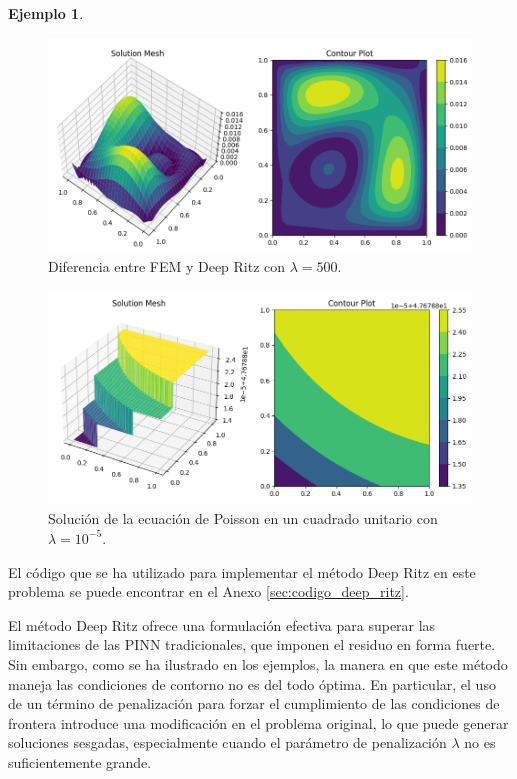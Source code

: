 \documentclass[a4paper,11pt,spanish, twoside, leqno]{tfg-uam}
\theoremstyle{definition}
\newtheorem{exmp}[teor]{Ejemplo}
\begin{document}
\begin{mdframed}
\begin{exmp}
        \begin{figure}[H]
            \centering
            \includegraphics[width=1\textwidth]{Figuras/DiferenciaCuadrado.png}
            \caption{Diferencia entre FEM y Deep Ritz con $\lambda = 500$.}
            \label{fig:diferencia_cuadrado}
        \end{figure}

        \begin{figure}[H]
            \centering
            \includegraphics[width=1\textwidth]{Figuras/PoissonSquare10e-5.png}
            \caption{Solución de la ecuación de Poisson en un cuadrado unitario con $\lambda = 10^{-5}$.}
            \label{fig:poisson_square_lambda_1e-5}
        \end{figure}

        El código que se ha utilizado para implementar el método Deep Ritz en este problema se puede encontrar en el Anexo \ref{sec:codigo_deep_ritz}.
    \end{exmp}
\end{mdframed}

El método Deep Ritz ofrece una formulación efectiva para superar las limitaciones de las PINN tradicionales, que imponen el residuo en forma fuerte. Sin embargo, como se ha ilustrado en los ejemplos, la manera en que este método maneja las condiciones de contorno no es del todo óptima. En particular, el uso de un término de penalización para forzar el cumplimiento de las condiciones de frontera introduce una modificación en el problema original, lo que puede generar soluciones sesgadas, especialmente cuando el parámetro de penalización $\lambda$ no es suficientemente grande.
\end{document}
